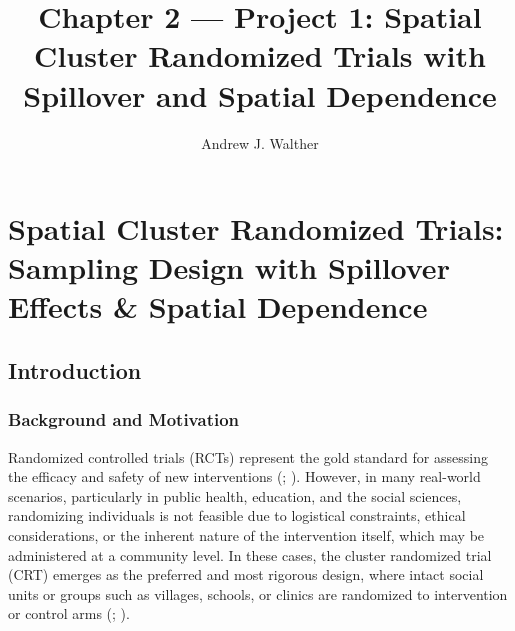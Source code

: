\documentclass[
  12pt,
  prelim]{bios-prelim}
\title{Chapter 2 --- Project 1: Spatial Cluster Randomized Trials with
Spillover and Spatial Dependence}
\author{Andrew J. Walther}
\date{}
\renewcommand{\maketitle}{}   %
\renewcommand*\contentsname{Table of contents}
\newcommand\contentsname{Table of contents}
\begin{document}
\maketitle


\frontmatter
\renewcommand{\contentsname}{TABLE OF CONTENTS}
\tableofcontents
\mainmatter
\setcounter{chapter}{1}

\chapter{Spatial Cluster Randomized Trials: Sampling Design with
Spillover Effects \& Spatial
Dependence}\label{spatial-cluster-randomized-trials-sampling-design-with-spillover-effects-spatial-dependence}

\section{Introduction}\label{sec-introduction}

\subsection{Background and Motivation}\label{background-and-motivation}

Randomized controlled trials (RCTs) represent the gold standard for
assessing the efficacy and safety of new interventions
(;
). However, in many
real-world scenarios, particularly in public health, education, and the
social sciences, randomizing individuals is not feasible due to
logistical constraints, ethical considerations, or the inherent nature
of the intervention itself, which may be administered at a community
level. In these cases, the cluster randomized trial (CRT) emerges as the
preferred and most rigorous design, where intact social units or groups
such as villages, schools, or clinics are randomized to intervention or
control arms (;
).
\end{document}
